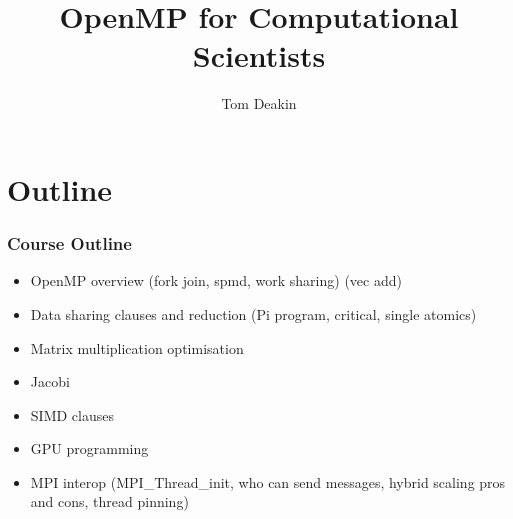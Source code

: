 \documentclass{beamer}
\author{Tom Deakin}
\title{OpenMP for Computational Scientists}
\begin{document}
\frame{\titlepage}

\section{Outline}
\begin{frame}
\frametitle{Course Outline}
\begin{itemize}
  \item OpenMP overview (fork join, spmd, work sharing) (vec add)
  \item Data sharing clauses and reduction (Pi program, critical, single atomics)
  \item Matrix multiplication optimisation
  \item Jacobi
  \item SIMD clauses
  \item GPU programming
  \item MPI interop (MPI\_Thread\_init, who can send messages, hybrid scaling pros and cons, thread pinning)
\end{itemize}
\end{frame}
\end{document}
